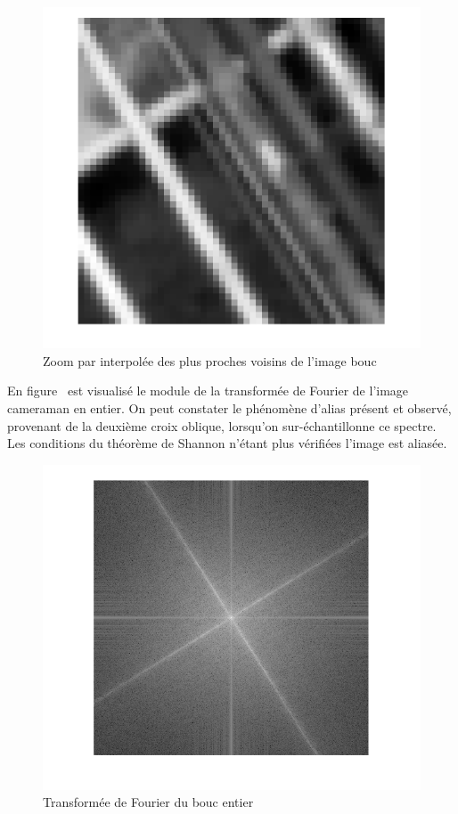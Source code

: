 \documentclass[12pt,a4paper,onecolumn]{article}
\begin{document}
\begin{figure}[H]
	\centering
	\includegraphics[height = 0.4\textheight]{bouc_nn}
	\caption{Zoom par interpolée des plus proches voisins de l'image bouc}
	\label{fig_bouc_nn}
\end{figure}

En figure~ est visualisé le module de la transformée de Fourier de l'image cameraman en entier. On peut constater le phénomène d'alias présent et observé, provenant de la deuxième croix oblique, lorsqu'on sur-échantillonne ce spectre. Les conditions du théorème de Shannon n'étant plus vérifiées l'image est aliasée.
\begin{figure}[H]
	\centering
	\includegraphics[height = 0.4\textheight]{bouc_ff}
	\caption{Transformée de Fourier du bouc entier}
	\label{fig_bouc_ff}
\end{figure}
\end{document}
